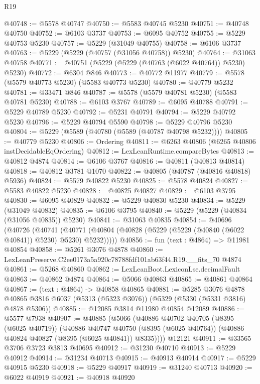 \begin{lexlean}{R19}
\begin{coremodule}
@40748 := @5578 @40747
@40750 := @5583 @40745 @5230
@40751 := @40748 @40750
@40752 := @6103 @3737
@40753 := @6095 @40752
@40755 := @5229 @40753 @5230
@40757 := @5229 (@31049 @40755)
@40758 := @6106 @3737
@40763 := @5229 (@5229 (@40757 (@31056 @40758)) @5230)
@40764 := @31063 @40758
@40771 := @40751 (@5229 (@5229 (@40763 (@6022 @40764)) @5230) @5230)
@40772 := @6304 @846
@40773 := @40772 @11977
@40779 := @5578 (@5579 @40773 @5230) (@5583 @40773 @5230)
@40780 := @40779 @5232
@40781 := @33471 @846
@40787 := @5578 (@5579 @40781 @5230) (@5583 @40781 @5230)
@40788 := @6103 @3767
@40789 := @6095 @40788
@40791 := @5229 @40789 @5230
@40792 := @5231 @40791
@40794 := @5229 @40792 @5230
@40796 := @5229 @40794 @5590
@40798 := @5229 @40796 @5230
@40804 := @5229 (@5589 (@40780 (@5589 (@40787 @40798 @5232))))
@40805 := @40779 @5230
@40806 := Ordering
@40811 := @6263 @40806 (@6265 @40806 instDecidableEqOrdering)
@40812 := LexLeanRuntime.compareBytes
@40813 := @40812 @4874
@40814 := @6106 @3767
@40816 := @40811 (@40813 @40814)
@40818 := @40812 @3781 @1070
@40822 := @40805 (@40787 (@40816 @40818) @5936)
@40824 := @5579 @40822 @5230
@40825 := @5578 @40824
@40827 := @5583 @40822 @5230
@40828 := @40825 @40827
@40829 := @6103 @3795
@40830 := @6095 @40829
@40832 := @5229 @40830 @5230
@40834 := @5229 (@31049 @40832)
@40835 := @6106 @3795
@40840 := @5229 (@5229 (@40834 (@31056 @40835)) @5230)
@40841 := @31063 @40835
@40854 := @40696
    (@40726
      (@40741 (@40771 (@40804 (@40828 (@5229 (@5229 (@40840 (@6022 @40841)) @5230) @5230) @5232)))))
@40856 := fun (text : @4864) => @11981 @40854
@40858 := @5261 @3076 @4878
@40860 := LexLeanPreserve.C2ee0173a5a920c78788fdf101ab63f44.R19.__fits_70 @4874
@40861 := @5268 @40860
@40862 := LexLeanBoot.LexiconLse.decimalFault
@40863 := @40862 @4874
@40864 := @5066 @40863
@40865 := @40861 @40864
@40867 := (text : @4864) -> @40858 @40865
@40881 := @5285
    @3076
    @4878
    @40865
    @3816
    @6037
    (@5313 (@5323 @3076))
    (@5329 (@5330 (@5331 @3816) @4878 @5306))
@40885 := @12085 @3814 @11980 @40854 @12089
@40886 := @5577 @7938
@40907 := @40885
    (@5066
      (@40886
        @40702
        @40705
        (@8395 (@6025 @40719))
        (@40886
          @40747
          @40750
          (@8395 (@6025 @40764))
          (@40886 @40824 @40827 (@8395 (@6025 @40841)) @8335))))
    @12121
@40911 := @33565 @3706 @3723 @3813 @40695
@40912 := @31230 @40710
@40913 := @5229 @40912
@40914 := @31234 @40713
@40915 := @40913 @40914
@40917 := @5229 @40915 @5230
@40918 := @5229 @40917
@40919 := @31240 @40713
@40920 := @6022 @40919
@40921 := @40918 @40920

\end{coremodule}
\end{lexlean}
